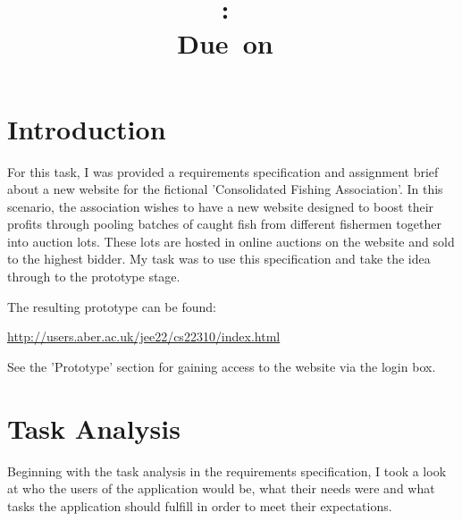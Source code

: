 \documentclass{article}
\title{
\vspace{2in}
\textmd{\textbf{\hmwkClass:\ \hmwkTitle}}\\
\normalsize\vspace{0.1in}\small{Due\ on\ \hmwkDueDate}\\
\vspace{3in}
}
\author{\textbf{\hmwkAuthorName}}
\date{} %
\begin{document}
\maketitle



\newpage
\tableofcontents
\newpage



\section{Introduction}
For this task, I was provided a requirements specification and assignment brief\cite{assignment} about a new website for the fictional 'Consolidated Fishing Association'. In this scenario, the association wishes to have a new website designed to boost their profits through pooling batches of caught fish from different fishermen together into auction lots. These lots are hosted in online auctions on the website and sold to the highest bidder. My task was to use this specification and take the idea through to the prototype stage.

The resulting prototype can be found:

\url{http://users.aber.ac.uk/jee22/cs22310/index.html}

See the 'Prototype' section for gaining access to the website via the login box.



\section{Task Analysis}
Beginning with the task analysis in the requirements specification, I took a look at who the users of the application would be, what their needs were and what tasks the application should fulfill in order to meet their expectations.
\end{document}
